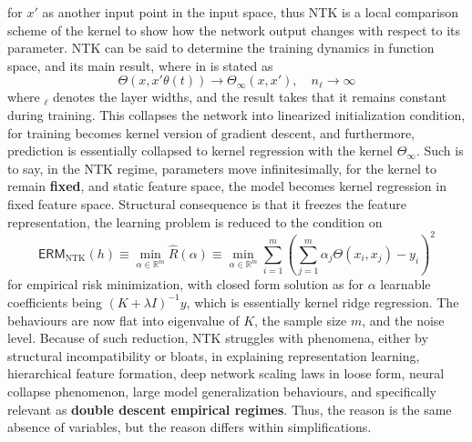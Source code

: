 for $x'$ as another input point in the input space, thus NTK is a local comparison scheme of the kernel to show how the network output changes with respect to its parameter. NTK can be said to determine the training dynamics in function space, and its main result, where in \cite{Jacot:2018:NTK} is stated as
\begin{equation}
    \Theta(x,x'\theta(t)) \to \Theta_{\infty}(x,x'), \quad n_{\ell}\to \infty
\end{equation}
where $_{\ell}$ denotes the layer widths, and the result takes that it remains constant during training. This collapses the network into linearized initialization condition, for training becomes kernel version of gradient descent, and furthermore, prediction is essentially collapsed to kernel regression with the kernel $\Theta_{\infty}$. Such is to say, in the NTK regime, parameters move infinitesimally, for the kernel to remain \textbf{fixed}, and static feature space, the model becomes kernel regression in fixed feature space. Structural consequence is that it freezes the feature representation, the learning problem is reduced to the condition on 
\begin{equation}
    \mathsf{ERM}_{\mathrm{NTK}}(h) \equiv \min_{\alpha\in\mathbb{R}^{m}} \hat{R}(\alpha) \equiv \min_{\alpha\in\mathbb{R}^{m}} \sum^{m}_{i=1} \left(\sum^{m}_{j=1}\alpha_{j}\Theta(x_{i},x_{j})-y_{i}\right)^{2} 
\end{equation}
for empirical risk minimization, with closed form solution as for $\alpha$ learnable coefficients being $(K+\lambda I)^{-1}y$, which is essentially kernel ridge regression. The behaviours are now flat into eigenvalue of $K$, the sample size $m$, and the noise level. Because of such reduction, NTK struggles with phenomena, either by structural incompatibility or bloats, in explaining representation learning, hierarchical feature formation, deep network scaling laws in loose form, neural collapse phenomenon, large model generalization behaviours, and specifically relevant as \textbf{double descent empirical regimes}. Thus, the reason is the same absence of variables, but the reason differs within simplifications. 

